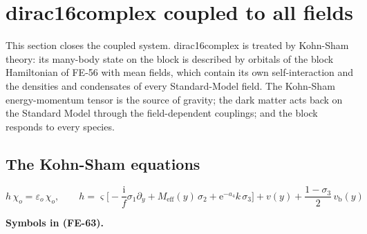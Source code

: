 \documentclass[
  10pt,
]{article}
\begin{document}
\hypertarget{dirac16complex-coupled-to-all-fields}{%
\section{dirac16complex coupled to all
fields}\label{dirac16complex-coupled-to-all-fields}}

This section closes the coupled system. dirac16complex is treated by
Kohn-Sham theory: its many-body state on the block is described by
orbitals of the block Hamiltonian of FE-56 with mean fields, which
contain its own self-interaction and the densities and condensates of
every Standard-Model field. The Kohn-Sham energy-momentum tensor is the
source of gravity; the dark matter acts back on the Standard Model
through the field-dependent couplings; and the block responds to every
species.

\hypertarget{the-kohn-sham-equations}{%
\subsection{The Kohn-Sham equations}\label{the-kohn-sham-equations}}

\[
h\,\chi_o = \varepsilon_o\,\chi_o,\qquad
h = \varsigma\Big[-\frac{\mathrm{i}}{f}\sigma_1\partial_y + M_{\mathrm{eff}}(y)\,\sigma_2 +
 \mathrm{e}^{-a_4}k\,\sigma_3\Big] + v(y)
 + \frac{1 - \sigma_3}{2}\,v_{\mathrm{b}}(y) \tag{FE-63}
\]

\textbf{Symbols in (FE-63).}
\end{document}
